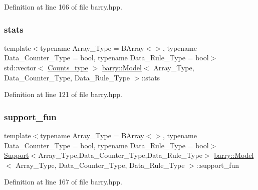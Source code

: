 Definition at line 166 of file barry.\+hpp.

\mbox{\label{classbarry_1_1_model_a09fa1641ee40f23bad698a7c78db4b87}} 
\subsubsection{\texorpdfstring{stats}{stats}}
{\footnotesize\ttfamily template$<$typename Array\+\_\+\+Type  = B\+Array$<$$>$, typename Data\+\_\+\+Counter\+\_\+\+Type  = bool, typename Data\+\_\+\+Rule\+\_\+\+Type  = bool$>$ \\
std\+::vector$<$ \hyperlink{namespacebarry_a3e2d8c3b6cf602107559d4237d9f1315}{Counts\+\_\+type} $>$ \hyperlink{classbarry_1_1_model}{barry\+::\+Model}$<$ Array\+\_\+\+Type, Data\+\_\+\+Counter\+\_\+\+Type, Data\+\_\+\+Rule\+\_\+\+Type $>$\+::stats}



Definition at line 121 of file barry.\+hpp.

\mbox{\label{classbarry_1_1_model_afd005aae0fdd12a8c68d1fd8823b3727}} 
\subsubsection{\texorpdfstring{support\+\_\+fun}{support\_fun}}
{\footnotesize\ttfamily template$<$typename Array\+\_\+\+Type  = B\+Array$<$$>$, typename Data\+\_\+\+Counter\+\_\+\+Type  = bool, typename Data\+\_\+\+Rule\+\_\+\+Type  = bool$>$ \\
\hyperlink{classbarry_1_1_support}{Support}$<$Array\+\_\+\+Type,Data\+\_\+\+Counter\+\_\+\+Type,Data\+\_\+\+Rule\+\_\+\+Type$>$ \hyperlink{classbarry_1_1_model}{barry\+::\+Model}$<$ Array\+\_\+\+Type, Data\+\_\+\+Counter\+\_\+\+Type, Data\+\_\+\+Rule\+\_\+\+Type $>$\+::support\+\_\+fun}



Definition at line 167 of file barry.\+hpp.

\mbox{\label{classbarry_1_1_model_ab2a0fde37b6a6da5a5faffcd24ec4c27}} 
